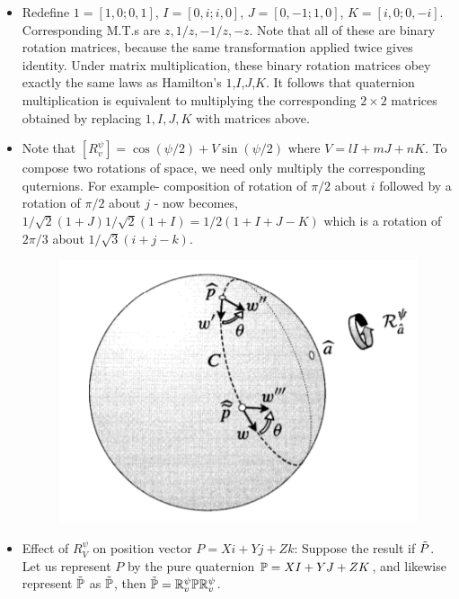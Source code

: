\documentclass[12pt]{article}
\def\mb{\ensuremath\mathbb}
\def\td{\ensuremath\tilde}
\def\R{\ensuremath\mb{R}}
\begin{document}
\begin{itemize}
    \item Redefine $1 = [1,0;0,1]$, $I=[0,i;i,0]$, $J=[0,-1;1,0]$, $K=[i,0;0,-i]$. Corresponding M.T.s are $z, 1/z,-1/z,-z$. Note that all of these are binary rotation matrices, because the same transformation applied twice gives identity. Under matrix multiplication, these binary rotation matrices obey exactly the same laws as Hamilton's $1$,$I$,$J$,$K$. It follows that quaternion multiplication is equivalent to multiplying the corresponding $2\times 2$ matrices obtained by replacing $1,I,J,K$ with matrices above.

    \item Note that $[R^{\psi}_{v}] = \cos(\psi/2) + V\sin(\psi/2)$ where $V = lI + mJ + nK$. To compose two rotations of space, we need only multiply the corresponding quternions. For example- composition of rotation of $\pi/2$ about $i$ followed by a rotation of $\pi/2$ about $j$ - now becomes, $1/\sqrt{2}(1+J)1/\sqrt{2}(1+I) = 1/2(1+I+J-K)$ which is a rotation of $2\pi/3$ about $1/\sqrt{3}(i+j-k)$.

    \begin{figure}[h!]
        \centering
        \includegraphics[scale=0.7]{fig_36}
        \label{fig_36}
    \end{figure}

    \item Effect of $R_{V}^{\psi}$ on position vector $P=Xi+Yj+Zk$: Suppose the result if $\td{P}$. Let us represent $P$ by the pure quaternion $\mb{P} = XI+YJ+ZK$, and likewise represent $\td{\mb{P}}$ as $\td{\mb{P}}$, then $\td{\mb{P}} = \R_{v}^{\psi}\mb{P}\R_{v}^{\psi}$.

\end{itemize}
\end{document}
